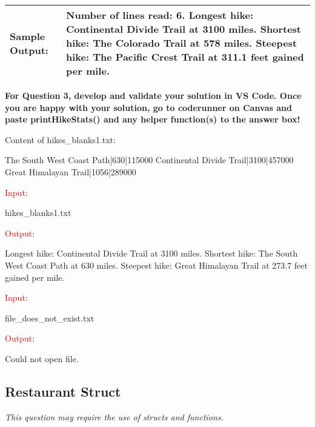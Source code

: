 \begin{longtable}{|p{1.7in}|p{4.3in}|}
\textbf{Sample Output:} &
Number of lines read: 6. \newline
Longest hike: Continental Divide Trail at 3100 miles. \newline
Shortest hike: The Colorado Trail at 578 miles. \newline
Steepest hike: The Pacific Crest Trail at 311.1 feet gained per mile.
\\ \hline
\end{longtable}

\textbf{For Question 3, develop and validate your solution in VS Code. Once you are happy with your solution, go to coderunner on Canvas and paste printHikeStats() and any helper function(s) to the answer box!}

\begin{sample}
Content of hikes\_blanks1.txt:

\begin{tcolorbox}[colframe=blue, colback=white, boxrule=0.5mm, arc=5mm]
The South West Coast Path|630|115000 \newline
\newline
\newline
Continental Divide Trail|3100|457000 \newline
Great Himalayan Trail|1056|289000 \newline
\newline
\end{tcolorbox}

\textcolor{red}{Input}:

hikes\_blanks1.txt

\textcolor{red}{Output}: 

Longest hike: Continental Divide Trail at 3100 miles. \newline
Shortest hike: The South West Coast Path at 630 miles. \newline
Steepest hike: Great Himalayan Trail at 273.7 feet gained per mile. 
\end{sample}

\begin{sample}

\textcolor{red}{Input}:

file\_does\_not\_exist.txt

\textcolor{red}{Output}:

Could not open file. 

\end{sample}


\subsection{Restaurant Struct} %
\textit{This question may require the use of structs and functions.} \newline

